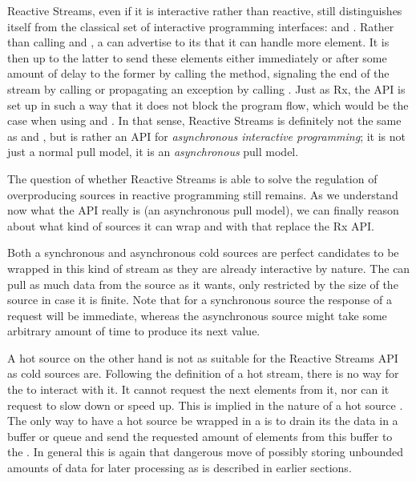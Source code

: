 Reactive Streams, even if it is interactive rather than reactive, still distinguishes itself from the classical set of interactive programming interfaces: \ieb and \ier. Rather than calling  and , a  can advertise to its  that it can handle  more element. It is then up to the latter to send these elements either immediately or after some amount of delay to the former by calling the  method, signaling the end of the stream by calling  or propagating an exception by calling . Just as Rx, the API is set up in such a way that it does not block the program flow, which would be the case when using \ieb and \ier. In that sense, Reactive Streams is definitely not the same as \ieb and \ier, but is rather an API for \textit{asynchronous interactive programming}; it is not just a normal pull model, it is an \textit{asynchronous} pull model.

The question of whether Reactive Streams is able to solve the regulation of overproducing sources in reactive programming still remains. As we understand now what the API really is (an asynchronous pull model), we can finally reason about what kind of sources it can wrap and with that replace the Rx API.

Both a synchronous and asynchronous cold sources are perfect candidates to be wrapped in this kind of stream as they are already interactive by nature. The  can pull as much data from the source as it wants, only restricted by the size of the source in case it is finite. Note that for a synchronous source the response of a request will be immediate, whereas the asynchronous source might take some arbitrary amount of time to produce its next value.

A hot source on the other hand is not as suitable for the Reactive Streams API as cold sources are. Following the definition of a hot stream, there is no way for the  to interact with it. It cannot request the next  elements from it, nor can it request to slow down or speed up. This is implied in the nature of a hot source \cite{berry1991-Reactive}. The only way to have a hot source be wrapped in a  is to drain its the data in a buffer or queue and send the requested amount of elements from this buffer to the . In general this is again that dangerous move of possibly storing unbounded amounts of data for later processing as is described in earlier sections.

